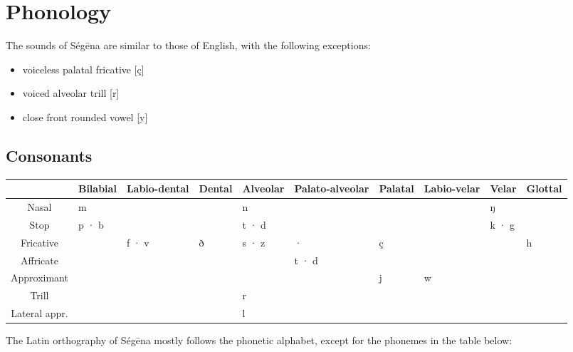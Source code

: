 \chapter{Phonology}

The sounds of Ségēna are similar to those of English, with the following
exceptions:

\begin{itemize}
	\item voiceless palatal fricative [ç]
	\item voiced alveolar trill [r]
	\item close front rounded vowel [y]
\end{itemize}

\section{Consonants}

\begin{table}[H]
\begin{tabularx}{\textwidth}{ c|Y|Y|Y|Y|Y|Y|Y|Y|Y }
	              & Bilabial & Labio-dental & Dental & Alveolar & Palato-alveolar & Palatal & Labio-velar & Velar & Glottal \\
	\hline
	Nasal         & m        &              &        & n        &                 &         &             & ŋ     &         \\
	Stop          & p · b    &              &        & t · d    &                 &         &             & k · g &         \\
	Fricative     &          & f · v        & ð      & s · z    & \sh{} · \zh{}   & ç       &             &       & h       \\
	Affricate     &          &              &        &          & t\sh{} · d\zh{} &         &             &       &         \\
	Approximant   &          &              &        &          &                 & j       & w           &       &         \\
	Trill         &          &              &        & r        &                 &         &             &       &         \\
	Lateral appr. &          &              &        & l        &                 &         &             &       &         \\
\end{tabularx}
\end{table}

The Latin orthography of Ségēna mostly follows the phonetic alphabet, except for
the phonemes in the table below:

